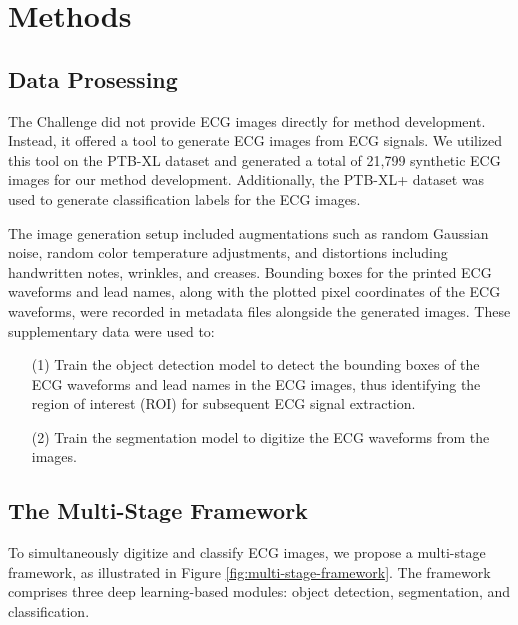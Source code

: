 \section{Methods}
\label{sec:methods}


\subsection{Data Prosessing}
\label{subsec:data_processing}


The Challenge did not provide ECG images directly for method development. Instead, it offered a tool \cite{Shivashankara_2024_ECG} to generate ECG images from ECG signals. We utilized this tool on the PTB-XL dataset \cite{wagner2020ptb_xl} and generated a total of 21,799 synthetic ECG images for our method development. Additionally, the PTB-XL+ dataset \cite{Strodthoff_2023} was used to generate classification labels for the ECG images.

The image generation setup included augmentations such as random Gaussian noise, random color temperature adjustments, and distortions including handwritten notes, wrinkles, and creases. Bounding boxes for the printed ECG waveforms and lead names, along with the plotted pixel coordinates of the ECG waveforms, were recorded in metadata files alongside the generated images. These supplementary data were used to:
\begin{itemize}
\item[(1)] Train the object detection model to detect the bounding boxes of the ECG waveforms and lead names in the ECG images, thus identifying the region of interest (ROI) for subsequent ECG signal extraction.
\item[(2)] Train the segmentation model to digitize the ECG waveforms from the images.
\end{itemize}

\subsection{The Multi-Stage Framework}
\label{subsec:multi_stage_framework}


To simultaneously digitize and classify ECG images, we propose a multi-stage framework, as illustrated in Figure \ref{fig:multi-stage-framework}. The framework comprises three deep learning-based modules: object detection, segmentation, and classification.

